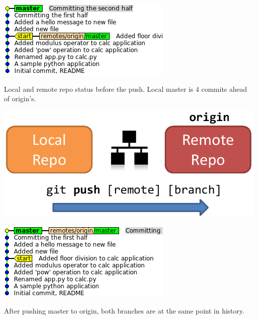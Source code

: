 \documentclass{tufte-handout}
\begin{document}
\begin{marginfigure}%
  \centering
  \includegraphics[width=\linewidth]{gitcommit-pre-push.png}
  \label{fig:gitcommit-pre-push}
  \caption{Local and remote repo status before the push. Local master is 4 commits ahead of origin's.}
\end{marginfigure}
\begin{marginfigure}%
  \centering
  \includegraphics[width=\linewidth]{gitpush-schema.pdf}
  \label{fig:gitpush-schema}
\end{marginfigure}
\begin{marginfigure}%
  \centering
  \includegraphics[width=\linewidth]{gitcommit-post-push.png}
  \label{fig:gitcommit-post-push}
  \caption{After pushing master to origin, both branches are at the same point in history.}
\end{marginfigure}
\end{document}
